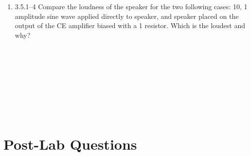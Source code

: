 \documentclass{article}
\begin{document}
\begin {enumerate}
        \item[3.5.1--4] Compare the loudness of the speaker for the two following cases: \unit{10}{\milli\volt}, \unit{1}{\kilo\hertz} amplitude sine wave applied directly to speaker, and speaker placed on the output of the CE amplifier biased with a \unit{1}{\kilo\ohm} resistor. Which is the loudest and why?
\\~\\~\\~\\~\\~\\~\\~\\~\\

\end{enumerate}

\pagebreak

\section{Post-Lab Questions}
\end{document}
